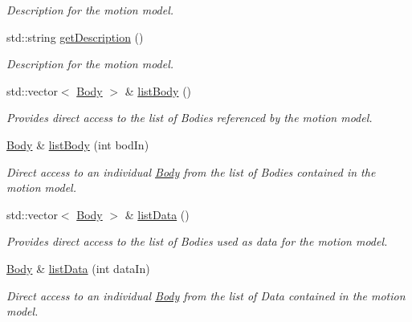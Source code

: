\begin{DoxyCompactItemize}
\begin{DoxyCompactList}\small\item\em Description for the motion model. \end{DoxyCompactList}\item 
std\-::string \hyperlink{classosea_1_1ofreq_1_1_motion_model_a8594356137407b25d03927a68a422dc9}{get\-Description} ()
\begin{DoxyCompactList}\small\item\em Description for the motion model. \end{DoxyCompactList}\item 
std\-::vector$<$ \hyperlink{classosea_1_1ofreq_1_1_body}{Body} $>$ \& \hyperlink{classosea_1_1ofreq_1_1_motion_model_a67ad0e6b993a20af61170cdebe8f418f}{list\-Body} ()
\begin{DoxyCompactList}\small\item\em Provides direct access to the list of Bodies referenced by the motion model. \end{DoxyCompactList}\item 
\hyperlink{classosea_1_1ofreq_1_1_body}{Body} \& \hyperlink{classosea_1_1ofreq_1_1_motion_model_a3c08da3c6cb3e959b53f2cf6f614d3c0}{list\-Body} (int bod\-In)
\begin{DoxyCompactList}\small\item\em Direct access to an individual \hyperlink{classosea_1_1ofreq_1_1_body}{Body} from the list of Bodies contained in the motion model. \end{DoxyCompactList}\item 
std\-::vector$<$ \hyperlink{classosea_1_1ofreq_1_1_body}{Body} $>$ \& \hyperlink{classosea_1_1ofreq_1_1_motion_model_ae63712716bcaff9ff263d9728f39323a}{list\-Data} ()
\begin{DoxyCompactList}\small\item\em Provides direct access to the list of Bodies used as data for the motion model. \end{DoxyCompactList}\item 
\hyperlink{classosea_1_1ofreq_1_1_body}{Body} \& \hyperlink{classosea_1_1ofreq_1_1_motion_model_a1d7e2b929c15789259aaf732efd7f752}{list\-Data} (int data\-In)
\begin{DoxyCompactList}\small\item\em Direct access to an individual \hyperlink{classosea_1_1ofreq_1_1_body}{Body} from the list of Data contained in the motion model. \end{DoxyCompactList}\item 

\end{DoxyCompactItemize}
